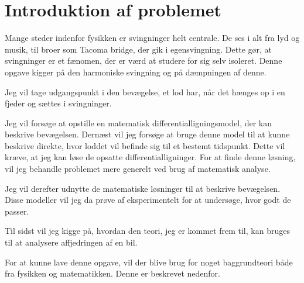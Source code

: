 \chapter{Introduktion af problemet}
Mange steder indenfor fysikken er svingninger helt centrale. 
De ses i alt fra lyd og musik, til broer som Tacoma bridge, der gik i egensvingning. 
Dette gør, at svingninger er et fænomen, der er værd at studere for sig selv isoleret. 
Denne opgave kigger på den harmoniske svingning og på dæmpningen af denne.

Jeg vil tage udgangspunkt i den bevægelse, et lod har, når det hænges op i en fjeder og sættes i svingninger.

Jeg vil forsøge at opstille en matematisk differentialligningsmodel, der kan beskrive bevægelsen.
Dernæst vil jeg forsøge at bruge denne model til at kunne beskrive direkte, hvor loddet vil befinde sig til et bestemt tidspunkt. 
Dette vil kræve, at jeg kan løse de opsatte differentialligninger. 
For at finde denne løsning, vil jeg behandle problemet mere generelt ved brug af matematisk analyse. 

Jeg vil derefter udnytte de matematiske løsninger til at beskrive bevægelsen.
Disse modeller vil jeg da prøve af eksperimentelt for at undersøge, hvor godt de passer. 

Til sidst vil jeg kigge på, hvordan den teori, jeg er kommet frem til, kan bruges til at analysere affjedringen af en bil. 
\vspace{1cm}

For at kunne lave denne opgave, vil der blive brug for noget baggrundteori både fra fysikken og matematikken. 
Denne er beskrevet nedenfor.


